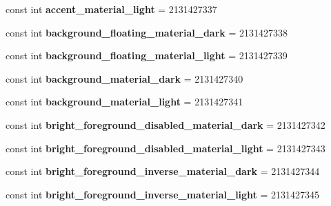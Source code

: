 \begin{DoxyCompactItemize}
const int {\bfseries accent\+\_\+material\+\_\+light} = 2131427337
\item 
\mbox{\label{classXaria_1_1Resource_1_1Color_a6ed42188d224f9960ab6e920c9c9e3fa}} 
const int {\bfseries background\+\_\+floating\+\_\+material\+\_\+dark} = 2131427338
\item 
\mbox{\label{classXaria_1_1Resource_1_1Color_abd40a10b61a114ff13fb170006da0afe}} 
const int {\bfseries background\+\_\+floating\+\_\+material\+\_\+light} = 2131427339
\item 
\mbox{\label{classXaria_1_1Resource_1_1Color_a832096d25abece9fed7f3492de40c75f}} 
const int {\bfseries background\+\_\+material\+\_\+dark} = 2131427340
\item 
\mbox{\label{classXaria_1_1Resource_1_1Color_a631d8f050055e665e94f915e22a13415}} 
const int {\bfseries background\+\_\+material\+\_\+light} = 2131427341
\item 
\mbox{\label{classXaria_1_1Resource_1_1Color_a27f8560c3674795ae725798fbe22e1e1}} 
const int {\bfseries bright\+\_\+foreground\+\_\+disabled\+\_\+material\+\_\+dark} = 2131427342
\item 
\mbox{\label{classXaria_1_1Resource_1_1Color_a0254bcc5ba246d0bf287d6848cb9afe4}} 
const int {\bfseries bright\+\_\+foreground\+\_\+disabled\+\_\+material\+\_\+light} = 2131427343
\item 
\mbox{\label{classXaria_1_1Resource_1_1Color_a1e551a9e88ec9aaa535f21b81f0ac0cd}} 
const int {\bfseries bright\+\_\+foreground\+\_\+inverse\+\_\+material\+\_\+dark} = 2131427344
\item 
\mbox{\label{classXaria_1_1Resource_1_1Color_a9948c81712549b6ed4416255c476380e}} 
const int {\bfseries bright\+\_\+foreground\+\_\+inverse\+\_\+material\+\_\+light} = 2131427345
\item 
\mbox{\label{classXaria_1_1Resource_1_1Color_a529219458b1c73695eab537b69e0464f}} 

\end{DoxyCompactItemize}
